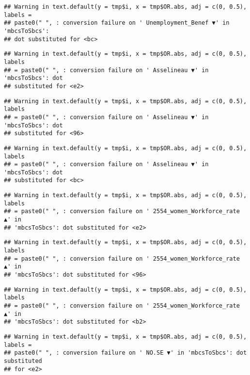 \documentclass[
]{article}
\begin{document}
\begin{verbatim}
## Warning in text.default(y = tmp$i, x = tmp$OR.abs, adj = c(0, 0.5), labels =
## paste0(" ", : conversion failure on ' Unemployment_Benef ▼' in 'mbcsToSbcs':
## dot substituted for <bc>
\end{verbatim}

\begin{verbatim}
## Warning in text.default(y = tmp$i, x = tmp$OR.abs, adj = c(0, 0.5), labels
## = paste0(" ", : conversion failure on ' Asselineau ▼' in 'mbcsToSbcs': dot
## substituted for <e2>
\end{verbatim}

\begin{verbatim}
## Warning in text.default(y = tmp$i, x = tmp$OR.abs, adj = c(0, 0.5), labels
## = paste0(" ", : conversion failure on ' Asselineau ▼' in 'mbcsToSbcs': dot
## substituted for <96>
\end{verbatim}

\begin{verbatim}
## Warning in text.default(y = tmp$i, x = tmp$OR.abs, adj = c(0, 0.5), labels
## = paste0(" ", : conversion failure on ' Asselineau ▼' in 'mbcsToSbcs': dot
## substituted for <bc>
\end{verbatim}

\begin{verbatim}
## Warning in text.default(y = tmp$i, x = tmp$OR.abs, adj = c(0, 0.5), labels
## = paste0(" ", : conversion failure on ' 2554_women_Workforce_rate ▲' in
## 'mbcsToSbcs': dot substituted for <e2>
\end{verbatim}

\begin{verbatim}
## Warning in text.default(y = tmp$i, x = tmp$OR.abs, adj = c(0, 0.5), labels
## = paste0(" ", : conversion failure on ' 2554_women_Workforce_rate ▲' in
## 'mbcsToSbcs': dot substituted for <96>
\end{verbatim}

\begin{verbatim}
## Warning in text.default(y = tmp$i, x = tmp$OR.abs, adj = c(0, 0.5), labels
## = paste0(" ", : conversion failure on ' 2554_women_Workforce_rate ▲' in
## 'mbcsToSbcs': dot substituted for <b2>
\end{verbatim}

\begin{verbatim}
## Warning in text.default(y = tmp$i, x = tmp$OR.abs, adj = c(0, 0.5), labels =
## paste0(" ", : conversion failure on ' NO.SE ▼' in 'mbcsToSbcs': dot substituted
## for <e2>
\end{verbatim}
\end{document}
